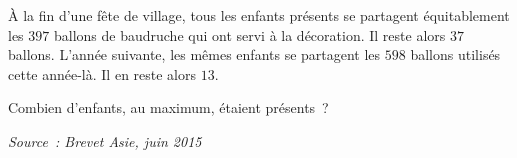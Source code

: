 \documentclass[exercice]{thedocument}%
\begin{document}
%
À la fin d'une fête de village, tous les enfants présents se partagent
équitablement les $397$ ballons de baudruche qui ont servi à la
décoration. Il reste alors $37$ ballons. L'année suivante, les mêmes
enfants se partagent les $598$ ballons utilisés cette année-là. Il en
reste alors $13$. \par 
Combien d'enfants, au maximum, étaient présents~?
\par\hfill{\scriptsize\textit{Source~: Brevet Asie, juin 2015}}
\end{document}

